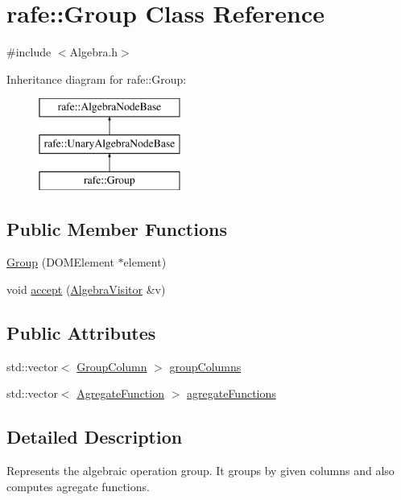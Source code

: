 \hypertarget{classrafe_1_1_group}{\section{rafe\+:\+:Group Class Reference}
\label{classrafe_1_1_group}
}


{\ttfamily \#include $<$Algebra.\+h$>$}

Inheritance diagram for rafe\+:\+:Group\+:\begin{figure}[H]
\begin{center}
\leavevmode
\includegraphics[height=3.000000cm]{classrafe_1_1_group}
\end{center}
\end{figure}
\subsection*{Public Member Functions}
\begin{DoxyCompactItemize}
\item 
\hyperlink{classrafe_1_1_group_a5536d2d9b3d8ce746697afc5eff32911}{Group} (D\+O\+M\+Element $\ast$element)
\item 
void \hyperlink{classrafe_1_1_group_ac2ef050b2a4c52f38cd7d5ab4bf52dfe}{accept} (\hyperlink{classrafe_1_1_algebra_visitor}{Algebra\+Visitor} \&v)
\end{DoxyCompactItemize}
\subsection*{Public Attributes}
\begin{DoxyCompactItemize}
\item 
std\+::vector$<$ \hyperlink{classrafe_1_1_group_column}{Group\+Column} $>$ \hyperlink{classrafe_1_1_group_a1b65b4d24bf834d05beb6ec00d9ed15b}{group\+Columns}
\item 
std\+::vector$<$ \hyperlink{classrafe_1_1_agregate_function}{Agregate\+Function} $>$ \hyperlink{classrafe_1_1_group_a774b152485b449b377745da5967a598d}{agregate\+Functions}
\end{DoxyCompactItemize}


\subsection{Detailed Description}
Represents the algebraic operation group. It groups by given columns and also computes agregate functions. 

